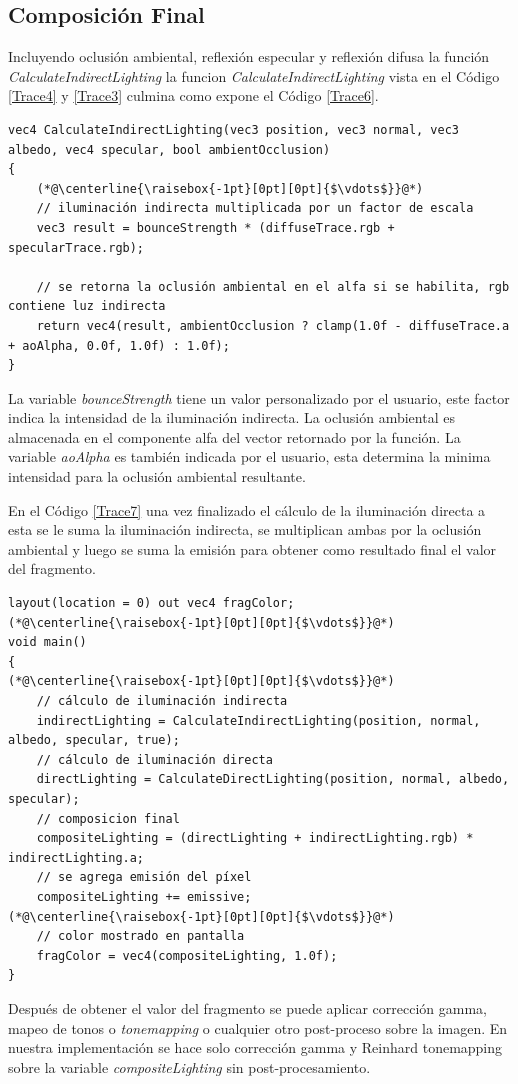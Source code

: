 \subsection{Composición Final} %
\label{sub:composicion_final}
Incluyendo oclusión ambiental, reflexión especular y reflexión difusa la función \emph{CalculateIndirectLighting} la funcion \emph{CalculateIndirectLighting} vista en el Código \ref{Trace4} y \ref{Trace3} culmina como expone el Código \ref{Trace6}.
\\
\begin{lstlisting}[caption={Composición para la iluminación indirecta.}, label=Trace6]
vec4 CalculateIndirectLighting(vec3 position, vec3 normal, vec3 albedo, vec4 specular, bool ambientOcclusion)
{
    (*@\centerline{\raisebox{-1pt}[0pt][0pt]{$\vdots$}}@*)
    // iluminación indirecta multiplicada por un factor de escala
    vec3 result = bounceStrength * (diffuseTrace.rgb + specularTrace.rgb);

    // se retorna la oclusión ambiental en el alfa si se habilita, rgb contiene luz indirecta
    return vec4(result, ambientOcclusion ? clamp(1.0f - diffuseTrace.a + aoAlpha, 0.0f, 1.0f) : 1.0f);
}
\end{lstlisting}

La variable \emph{bounceStrength} tiene un valor personalizado por el usuario, este factor indica la intensidad de la iluminación indirecta. La oclusión ambiental es almacenada en el componente alfa del vector retornado por la función. La variable \emph{aoAlpha} es también indicada por el usuario, esta determina la minima intensidad para la oclusión ambiental resultante.

En el Código \ref{Trace7} una vez finalizado el cálculo de la iluminación directa a esta se le suma la iluminación indirecta, se multiplican ambas por la oclusión ambiental y luego se suma la emisión para obtener como resultado final el valor del fragmento.
\\
\begin{lstlisting}[caption={Composición final de imagen.}, label=Trace7]
layout(location = 0) out vec4 fragColor;
(*@\centerline{\raisebox{-1pt}[0pt][0pt]{$\vdots$}}@*)
void main()
{
(*@\centerline{\raisebox{-1pt}[0pt][0pt]{$\vdots$}}@*)
    // cálculo de iluminación indirecta
    indirectLighting = CalculateIndirectLighting(position, normal, albedo, specular, true);
    // cálculo de iluminación directa
    directLighting = CalculateDirectLighting(position, normal, albedo, specular);
    // composicion final 
    compositeLighting = (directLighting + indirectLighting.rgb) * indirectLighting.a;
    // se agrega emisión del píxel
    compositeLighting += emissive;
(*@\centerline{\raisebox{-1pt}[0pt][0pt]{$\vdots$}}@*)
    // color mostrado en pantalla
    fragColor = vec4(compositeLighting, 1.0f);
}
\end{lstlisting}

Después de obtener el valor del fragmento se puede aplicar corrección gamma, mapeo de tonos o \emph{tonemapping} o cualquier otro post-proceso sobre la imagen. En nuestra implementación se hace solo corrección gamma y Reinhard tonemapping \cite{Reinhard:2002:PTR:566570.566575} sobre la variable \emph{compositeLighting} sin post-procesamiento.
